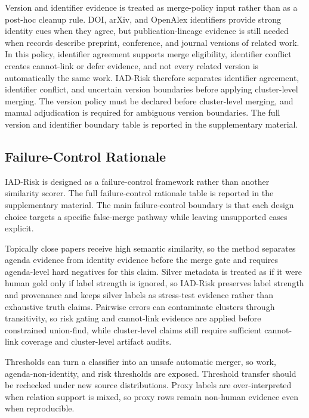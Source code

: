 \documentclass[preprint,12pt]{elsarticle}
\begin{document}
Version and identifier evidence is treated as merge-policy input rather than as a post-hoc cleanup rule. DOI, arXiv, and OpenAlex identifiers provide strong identity cues when they agree, but publication-lineage evidence is still needed when records describe preprint, conference, and journal versions of related work. In this policy, identifier agreement supports merge eligibility, identifier conflict creates cannot-link or defer evidence, and not every related version is automatically the same work. IAD-Risk therefore separates identifier agreement, identifier conflict, and uncertain version boundaries before applying cluster-level merging. The version policy must be declared before cluster-level merging, and manual adjudication is required for ambiguous version boundaries. The full version and identifier boundary table is reported in the supplementary material.

\subsection{Failure-Control Rationale}

IAD-Risk is designed as a failure-control framework rather than another similarity scorer. The full failure-control rationale table is reported in the supplementary material. The main failure-control boundary is that each design choice targets a specific false-merge pathway while leaving unsupported cases explicit.

Topically close papers receive high semantic similarity, so the method separates agenda evidence from identity evidence before the merge gate and requires agenda-level hard negatives for this claim. Silver metadata is treated as if it were human gold only if label strength is ignored, so IAD-Risk preserves label strength and provenance and keeps silver labels as stress-test evidence rather than exhaustive truth claims. Pairwise errors can contaminate clusters through transitivity, so risk gating and cannot-link evidence are applied before constrained union-find, while cluster-level claims still require sufficient cannot-link coverage and cluster-level artifact audits.

Thresholds can turn a classifier into an unsafe automatic merger, so work, agenda-non-identity, and risk thresholds are exposed. Threshold transfer should be rechecked under new source distributions. Proxy labels are over-interpreted when relation support is mixed, so proxy rows remain non-human evidence even when reproducible.
\end{document}

